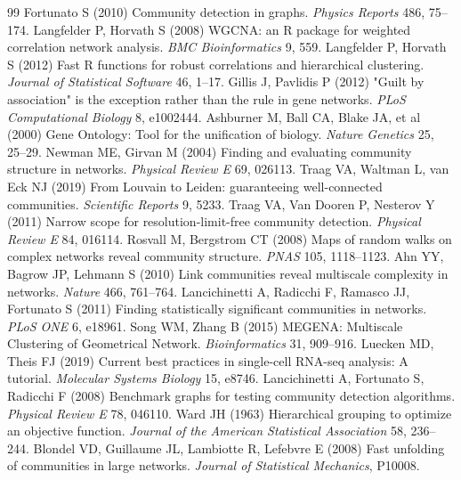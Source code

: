 \documentclass[twocolumn,10pt,letterpaper]{article}
\begin{document}
{
\setlength{\itemsep}{1pt}
\setlength{\parskip}{0pt}
\begin{thebibliography}{99}
\setlength{\itemsep}{1.5pt}
 Fortunato S (2010) Community detection in graphs. \textit{Physics Reports} 486, 75--174.
 Langfelder P, Horvath S (2008) WGCNA: an R package for weighted correlation network analysis. \textit{BMC Bioinformatics} 9, 559.
 Langfelder P, Horvath S (2012) Fast R functions for robust correlations and hierarchical clustering. \textit{Journal of Statistical Software} 46, 1--17.
 Gillis J, Pavlidis P (2012) "Guilt by association" is the exception rather than the rule in gene networks. \textit{PLoS Computational Biology} 8, e1002444.
 Ashburner M, Ball CA, Blake JA, et al (2000) Gene Ontology: Tool for the unification of biology. \textit{Nature Genetics} 25, 25--29.
 Newman ME, Girvan M (2004) Finding and evaluating community structure in networks. \textit{Physical Review E} 69, 026113.
 Traag VA, Waltman L, van Eck NJ (2019) From Louvain to Leiden: guaranteeing well-connected communities. \textit{Scientific Reports} 9, 5233.
 Traag VA, Van Dooren P, Nesterov Y (2011) Narrow scope for resolution-limit-free community detection. \textit{Physical Review E} 84, 016114.
 Rosvall M, Bergstrom CT (2008) Maps of random walks on complex networks reveal community structure. \textit{PNAS} 105, 1118--1123.
 Ahn YY, Bagrow JP, Lehmann S (2010) Link communities reveal multiscale complexity in networks. \textit{Nature} 466, 761--764.
 Lancichinetti A, Radicchi F, Ramasco JJ, Fortunato S (2011) Finding statistically significant communities in networks. \textit{PLoS ONE} 6, e18961.
 Song WM, Zhang B (2015) MEGENA: Multiscale Clustering of Geometrical Network. \textit{Bioinformatics} 31, 909--916.
 Luecken MD, Theis FJ (2019) Current best practices in single-cell RNA-seq analysis: A tutorial. \textit{Molecular Systems Biology} 15, e8746.
 Lancichinetti A, Fortunato S, Radicchi F (2008) Benchmark graphs for testing community detection algorithms. \textit{Physical Review E} 78, 046110.
 Ward JH (1963) Hierarchical grouping to optimize an objective function. \textit{Journal of the American Statistical Association} 58, 236--244.
 Blondel VD, Guillaume JL, Lambiotte R, Lefebvre E (2008) Fast unfolding of communities in large networks. \textit{Journal of Statistical Mechanics}, P10008.

\end{thebibliography}}
\end{document}
